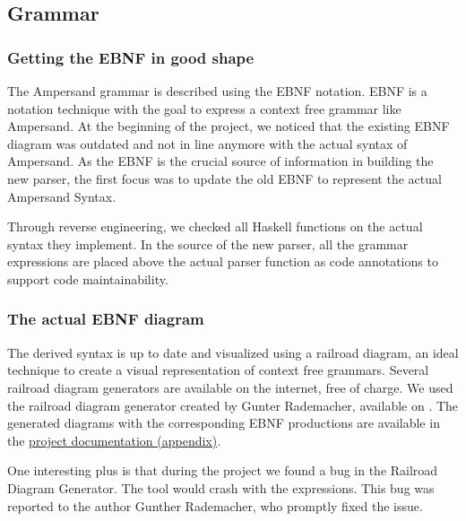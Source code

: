 
\subsection{Grammar}
\label{analysis:grammar}

\subsubsection{Getting the EBNF in good shape}
%
%
The Ampersand grammar is described using the EBNF notation. 
EBNF is a notation technique with the goal to express a context free grammar like Ampersand.
At the beginning of the project, we noticed that the existing EBNF diagram was outdated and not in line anymore with the actual syntax of Ampersand.
As the EBNF is the crucial source of information in building the new parser, the first focus was to update the old EBNF to represent the actual Ampersand Syntax.

Through reverse engineering, we checked all Haskell functions on the actual syntax they implement.
In the source of the new parser, all the grammar expressions are placed above the actual parser function as code annotations to support code maintainability.

\subsubsection{The actual EBNF diagram}
The derived syntax is up to date and visualized using a railroad diagram, an ideal technique to create a visual representation of context free grammars.
Several railroad diagram generators are available on the internet, free of charge.
We used the railroad diagram generator created by Gunter Rademacher, available on .
The generated diagrams with the corresponding EBNF productions are available in the \hyperref[app:docs]{project documentation (appendix)}.

One interesting plus is that during the project we found a bug in the Railroad Diagram Generator.
The tool would crash with the  expressions.
This bug was reported to the author Gunther Rademacher, who promptly fixed the issue.
